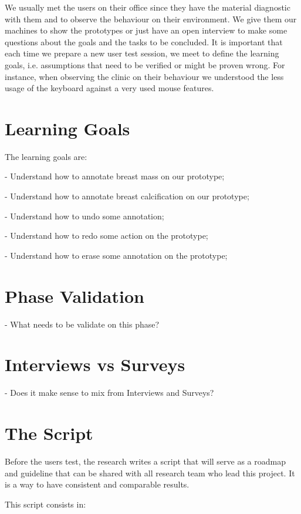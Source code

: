 We usually met the users on their office since they have the material diagnostic with them and to observe the behaviour on their environment. We give them our machines to show the prototypes or just have an open interview to make some questions about the goals and the tasks to be concluded. It is important that each time we prepare a new user test session, we meet to define the learning goals, i.e. assumptions that need to be verified or might be proven wrong. For instance, when observing the clinic on their behaviour we understood the less usage of the keyboard against a very used mouse features.

\clearpage

\section{Learning Goals}

The learning goals are:

- Understand how to annotate breast mass on our prototype;

- Understand how to annotate breast calcification on our prototype;

- Understand how to undo some annotation;

- Understand how to redo some action on the prototype;

- Understand how to erase some annotation on the prototype;

\section{Phase Validation}

- What needs to be validate on this phase?

\section{Interviews vs Surveys}

- Does it make sense to mix from Interviews and Surveys?

\section{The Script}

Before the users test, the research writes a script that will serve as a roadmap and guideline that can be shared with all research team who lead this project. It is a way to have consistent and comparable results.

This script consists in:

